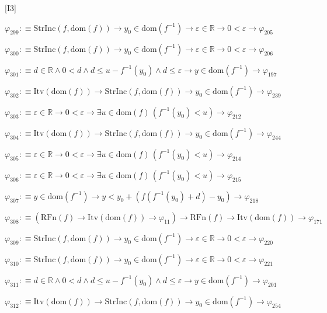 \begin{fullproof}{[I3]}
\begin{abbrevlist}
\item $\varphi_{299} :\equiv \mathrm{StrInc}(f,\mathrm{dom}(f)) \to y_{0} \in \mathrm{dom}(f^{-1}) \to \varepsilon \in \mathbb{R} \to 0 < \varepsilon \to \varphi_{205}$
\item $\varphi_{300} :\equiv \mathrm{StrInc}(f,\mathrm{dom}(f)) \to y_{0} \in \mathrm{dom}(f^{-1}) \to \varepsilon \in \mathbb{R} \to 0 < \varepsilon \to \varphi_{206}$
\item $\varphi_{301} :\equiv d \in \mathbb{R} \land 0 < d \land d \leq u - f^{-1}(y_{0}) \land d \leq \varepsilon \to y \in \mathrm{dom}(f^{-1}) \to \varphi_{197}$
\item $\varphi_{302} :\equiv \mathrm{Itv}(\mathrm{dom}(f)) \to \mathrm{StrInc}(f,\mathrm{dom}(f)) \to y_{0} \in \mathrm{dom}(f^{-1}) \to \varphi_{239}$
\item $\varphi_{303} :\equiv \varepsilon \in \mathbb{R} \to 0 < \varepsilon \to \exists u \in \mathrm{dom}(f)\,(f^{-1}(y_{0}) < u) \to \varphi_{212}$
\item $\varphi_{304} :\equiv \mathrm{Itv}(\mathrm{dom}(f)) \to \mathrm{StrInc}(f,\mathrm{dom}(f)) \to y_{0} \in \mathrm{dom}(f^{-1}) \to \varphi_{244}$
\item $\varphi_{305} :\equiv \varepsilon \in \mathbb{R} \to 0 < \varepsilon \to \exists u \in \mathrm{dom}(f)\,(f^{-1}(y_{0}) < u) \to \varphi_{214}$
\item $\varphi_{306} :\equiv \varepsilon \in \mathbb{R} \to 0 < \varepsilon \to \exists u \in \mathrm{dom}(f)\,(f^{-1}(y_{0}) < u) \to \varphi_{215}$
\item $\varphi_{307} :\equiv y \in \mathrm{dom}(f^{-1}) \to y < y_{0} + (f(f^{-1}(y_{0}) + d) - y_{0}) \to \varphi_{218}$
\item $\varphi_{308} :\equiv (\mathrm{RFn}(f) \to \mathrm{Itv}(\mathrm{dom}(f)) \to \varphi_{11}) \to \mathrm{RFn}(f) \to \mathrm{Itv}(\mathrm{dom}(f)) \to \varphi_{171}$
\item $\varphi_{309} :\equiv \mathrm{StrInc}(f,\mathrm{dom}(f)) \to y_{0} \in \mathrm{dom}(f^{-1}) \to \varepsilon \in \mathbb{R} \to 0 < \varepsilon \to \varphi_{220}$
\item $\varphi_{310} :\equiv \mathrm{StrInc}(f,\mathrm{dom}(f)) \to y_{0} \in \mathrm{dom}(f^{-1}) \to \varepsilon \in \mathbb{R} \to 0 < \varepsilon \to \varphi_{221}$
\item $\varphi_{311} :\equiv d \in \mathbb{R} \land 0 < d \land d \leq u - f^{-1}(y_{0}) \land d \leq \varepsilon \to y \in \mathrm{dom}(f^{-1}) \to \varphi_{201}$
\item $\varphi_{312} :\equiv \mathrm{Itv}(\mathrm{dom}(f)) \to \mathrm{StrInc}(f,\mathrm{dom}(f)) \to y_{0} \in \mathrm{dom}(f^{-1}) \to \varphi_{254}$

\end{abbrevlist}
\end{fullproof}
